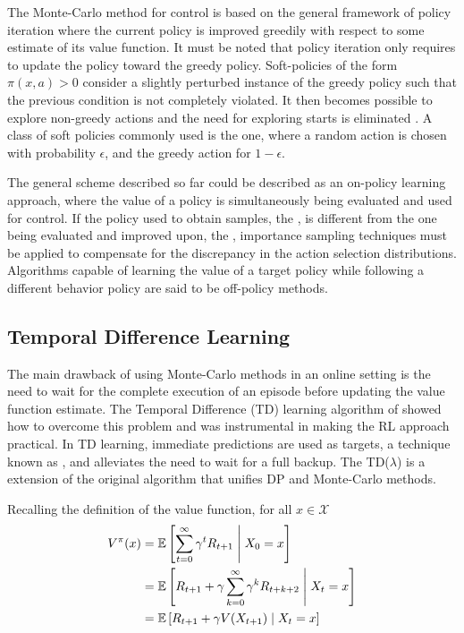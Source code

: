 The Monte-Carlo method for control is based on the general framework of policy
iteration where the current policy is improved greedily with respect to some
estimate of its value function. It must be noted that policy iteration only requires to update the policy
toward the greedy policy.  Soft-policies of the form $\pi(x, a) > 0$ consider a slightly perturbed instance
of the greedy policy such that the previous condition is not completely violated. It then becomes possible to explore non-greedy actions and the need for exploring starts is eliminated \parencite{SuttonBarto1998}. A class of soft policies commonly used is the  one, where a random action is chosen with probability $\epsilon$, and the greedy action for $1 - \epsilon$. 

The  general scheme described so far could be described as an on-policy learning approach,
where the value of a policy is simultaneously being evaluated and used for control.
If the policy used to obtain samples, the , is different from
the one being evaluated and improved upon, the ,
importance sampling techniques must be applied to compensate for the
discrepancy in the action selection distributions. Algorithms capable of learning the value of a target policy while following a different behavior policy are said to be off-policy methods.

\subsection{Temporal Difference Learning}
The main drawback of using Monte-Carlo methods in an online setting is
the need to wait for the complete execution of an episode before updating the value
function estimate. The Temporal Difference (TD) learning algorithm of \cite{Sutton1984} showed how to overcome this problem and was instrumental in making the RL approach practical. In TD learning, immediate predictions are used as targets, a technique known as
, and alleviates the need to wait for a full backup. The TD($\lambda$) is a extension of the original algorithm that unifies DP and Monte-Carlo methods.

Recalling the definition of the value function, for all $x \in \mathcal{X}$
\begin{align}
V^\pi(x) &= \operatorname{\mathbb{E}} \left[ \sum_{t=0}^\infty \gamma^t R_{t+1}  \;\middle\vert\;  X_0 =
x\right] \notag \\
&= \operatorname{\mathbb{E}} \left[ R_{t+1} + \gamma \sum_{k=0}^\infty \gamma^k
R_{t+k+2}\;\middle\vert\; X_t = x\right]  \notag \\
&= \operatorname{\mathbb{E}} \left[ R_{t+1} + \gamma V(X_{t+1}) \;\middle\vert\; X_t = x\right]
\label{eq:value-function-recursive}
\end{align}

